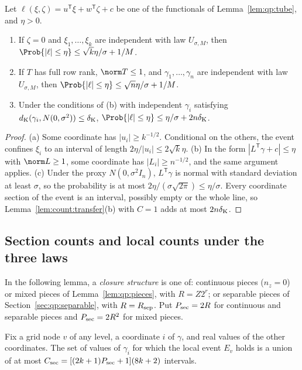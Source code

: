 \begin{lemma}\label{lem:qp:tube-prob}
Let $\ell(\xi,\zeta)=u^{\mathsf T}\xi+w^{\mathsf T}\zeta+c$ be one of the functionals of
Lemma~\ref{lem:qp:tube}, and $\eta>0$.
\begin{enumerate}[label=(\alph*)]
\item If $\zeta=0$ and $\xi_1,\dots,\xi_k$ are independent with law
 $U_{\sigma,M}$, then $\Prob\{|\ell|\le\eta\}\le\sqrt k\eta/\sigma+1/M$.
\item If $T$ has full row rank, $\norm T\le1$, and $\gamma_1,\dots,\gamma_n$ are
 independent with law $U_{\sigma,M}$, then
 $\Prob\{|\ell|\le\eta\}\le\sqrt n\eta/\sigma+1/M$.
\item Under the conditions of (b) with independent $\gamma_i$ satisfying
 $d_{\rm K}(\gamma_i,N(0,\sigma^2))\le\delta_{\rm K}$,
 $\Prob\{|\ell|\le\eta\}\le\eta/\sigma+2n\delta_{\rm K}$.
\end{enumerate}
\end{lemma}

\begin{proof}
(a) Some coordinate has $|u_i|\ge k^{-1/2}$. Conditional on the others, the
event confines $\xi_i$ to an interval of length $2\eta/|u_i|\le2\sqrt k\eta$.
(b) In the form $|L^{\mathsf T}\gamma+c|\le\eta$ with $\norm L\ge1$, some coordinate
has $|L_i|\ge n^{-1/2}$, and the same argument applies. (c) Under the proxy
$N(0,\sigma^2I_n)$, $L^{\mathsf T}\gamma$ is normal with standard deviation at least
$\sigma$, so the probability is at most $2\eta/(\sigma\sqrt{2\pi})\le\eta/\sigma$.
Every coordinate section of the event is an interval, possibly empty or the
whole line, so Lemma~\ref{lem:count:transfer}(b) with $C=1$ adds at most
$2n\delta_{\rm K}$.
\end{proof}

\subsection{Section counts and local counts under the three laws}

In the following lemma, a \emph{closure structure} is one of: continuous
pieces ($n_z=0$) or mixed pieces of Lemma~\ref{lem:qp:pieces}, with $R=Z2^r$;
or separable pieces of Section~\ref{sec:qp:separable}, with $R=R_{\rm sep}$.
Put $P_{\rm sec}=2R$ for continuous and separable pieces and
$P_{\rm sec}=2R^2$ for mixed pieces.

\begin{lemma}\label{lem:qp:sections}
Fix a grid node $v$ of any level, a coordinate $i$ of $\gamma$, and real
values of the other coordinates. The set of values of $\gamma_i$ for which the
local event $E_v$ holds is a union of at most
$C_{\rm sec}=[(2k+1)P_{\rm sec}+1](8k+2)$ intervals.
\end{lemma}

